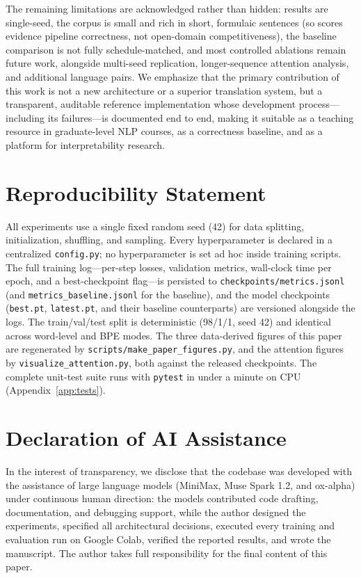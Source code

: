 \documentclass[10pt]{article}
\begin{document}
The remaining limitations are acknowledged rather than hidden: results are single-seed, the corpus is small and rich in short, formulaic sentences (so scores evidence pipeline correctness, not open-domain competitiveness), the baseline comparison is not fully schedule-matched, and most controlled ablations remain future work, alongside multi-seed replication, longer-sequence attention analysis, and additional language pairs. We emphasize that the primary contribution of this work is not a new architecture or a superior translation system, but a transparent, auditable reference implementation whose development process---including its failures---is documented end to end, making it suitable as a teaching resource in graduate-level NLP courses, as a correctness baseline, and as a platform for interpretability research.

\section*{Reproducibility Statement}
All experiments use a single fixed random seed (42) for data splitting, initialization, shuffling, and sampling. Every hyperparameter is declared in a centralized \texttt{config.py}; no hyperparameter is set ad hoc inside training scripts. The full training log---per-step losses, validation metrics, wall-clock time per epoch, and a best-checkpoint flag---is persisted to \texttt{checkpoints/metrics.jsonl} (and \texttt{metrics\_baseline.jsonl} for the baseline), and the model checkpoints (\texttt{best.pt}, \texttt{latest.pt}, and their baseline counterparts) are versioned alongside the logs. The train/val/test split is deterministic (98/1/1, seed 42) and identical across word-level and BPE modes. The three data-derived figures of this paper are regenerated by \texttt{scripts/make\_paper\_figures.py}, and the attention figures by \texttt{visualize\_attention.py}, both against the released checkpoints. The complete unit-test suite runs with \texttt{pytest} in under a minute on CPU (Appendix~\ref{app:tests}).

\section*{Declaration of AI Assistance}
In the interest of transparency, we disclose that the codebase was developed with the assistance of large language models (MiniMax, Muse Spark 1.2, and ox-alpha) under continuous human direction: the models contributed code drafting, documentation, and debugging support, while the author designed the experiments, specified all architectural decisions, executed every training and evaluation run on Google Colab, verified the reported results, and wrote the manuscript. The author takes full responsibility for the final content of this paper.
\end{document}
